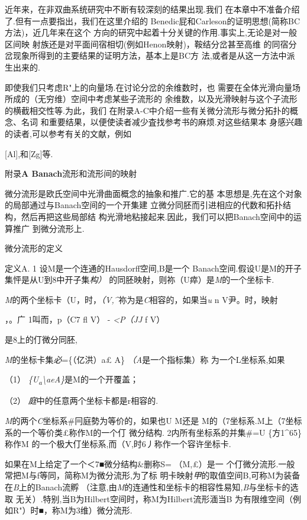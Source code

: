 \documentclass{article}
\begin{document}
近年来，在非双曲系统研究中不断有较深刻的结果出现.我们
在本章中不准备介绍了.但有一点要指出，我们在这里介绍的
Benedic屁和Carleson的证明思想(简称BC方法)，近几年来在这个
方向的研究中起着十分关键的作用.事实上,无论是对一般区间映
射族还是对平面间宿相切(例如Henon映射)，鞍结分岔甚至高维
的同宿分岔现象所得到的主要结果的证明方法，基本上是BC方
法,或者是从这一方法中派生出来的.

即使我们只考虑R"上的向量场.在讨论分岔的余维数时，也
需要在全体光滑向量场所成的（无穷维）空间中考虑某些子流形的
余维数，以及光滑映射与这个子流形的横截相交性等.为此，我们
在附录A-C中介绍一些有关微分流形与微分拓扑的概念、名词
和重要结果，以便使读者减少査找参考书的麻烦.对这些结果本
身感兴趣的读者,可以参考有关的文献，例如

{[}Al{]},和{[}Zg{]}等.

附录\textbf{A Banach}流形和流形间的映射

微分流形是欧氏空间中光滑曲面概念的抽象和推广.它的基
本思想是,先在这个对象的局部通过与Banach空间的一个开集建
立微分同胚而引进相应的代数和拓扑结构，然后再把这些局部结
构光滑地粘接起来.因此，我们可以把Banach空间中的运算推广 到微分流形上.

微分流形的定义

定义A. 1 设M是一个连通的Hausdorff空间,B是一个
Banach空间.假设U是M的开子集怦是从U到8中开子集\emph{构）}
的同胚映射，则祢（U瘁）是\emph{M}的一个坐标卡.

\emph{M}的两个坐标卡（U，时，\emph{（V,\^{}}祢为是\emph{C}相容的，如果当\emph{u}
n V尹。时，映射

，。广 1叫而，p（C7 fl V） - \emph{\textless{}P（JJ} f\textbar{} V）

是8上的仃微分同胚,

\emph{M}的坐标卡集\emph{必}=\{（亿洪）\textbar{}a£ A\}
\emph{（A}是一个指标集）称 为一个L坐标系,如果

（1） \emph{\{U\textsubscript{a}\textbackslash{}aeA\}}是M的一个开覆盖；

（2） \emph{庭}中的任意两个坐标卡都是r相容的.

\emph{M}的两个\emph{C}坐标系\#冃庭勢为等价的，如果也U M还是
M的（7坐标系.M上（7坐标系的一个等价类£称作M的一个仃 微分结构.
2内所有坐标系的并集\#=U \{方1\^{}65\}称作M
的一个极大仃坐标系,而（V,时6丿称作一个容许坐标卡.

如果在M上给定了一个＜7■微分结构\&删称S= （M,£）是一
个仃微分流形.一般常把M与f等同，简称M为微分流形,为了标
明卡映射\emph{甲}的取值空间B,可称M为装备在\emph{B}上的Banach流孵
（注意,由\emph{M}的连通性和坐标卡的相容性易知\emph{,B}与坐标卡的选取
无关）.特别,当B为Hilbert空间时，称M为Hilbert流形湎当B
为有限维空间（例如R"）时■，称M为3维）微分流形.
\end{document}
